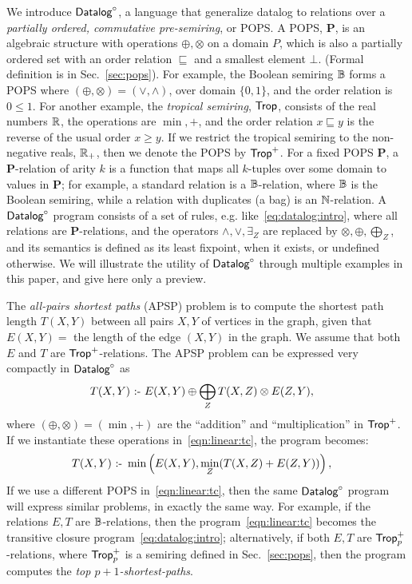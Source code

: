 We introduce $\text{\sf Datalog}^\circ$, a language that generalize datalog to relations
over a {\em partially ordered, commutative pre-semiring}, or POPS.  A
POPS, $\bm P$, is an algebraic structure with operations
$\oplus, \otimes$ on a domain $P$, which is also a partially ordered set with an order
relation $\sqsubseteq$ and a smallest element $\bot$. (Formal
definition is in Sec.~\ref{sec:pops}).  For example, the Boolean
semiring $\mathbb B$ forms a POPS where $(\oplus,\otimes) = (\vee, \wedge)$, over domain
$\{0,1\}$, and the order relation is $0 \leq 1$.  For another example, the {\em
  tropical semiring}, $\text{\sf Trop}$, consists of the real numbers $\mathbb R$, the
operations are $\min, +$, and the order relation $x \sqsubseteq y$ is
the reverse of the usual order $x \geq y$.  If
we restrict the tropical semiring to the non-negative reals, $\mathbb R_+$, then
we denote the POPS by $\text{\sf Trop}^+$.  For a fixed POPS $\bm P$, a
$\bm P$-relation of arity $k$ is a function that maps all $k$-tuples
over some domain to values in $\bm P$; for example, a standard
relation is a $\mathbb B$-relation, where $\mathbb B$ is the Boolean semiring, while
a relation with duplicates (a bag) is an $\mathbb N$-relation.  A $\text{\sf Datalog}^\circ$
program consists of a set of rules, e.g.
like~\eqref{eq:datalog:intro}, where all relations are
$\bm P$-relations, and the operators $\wedge, \vee, \exists_Z$ are
replaced by $\otimes, \oplus, \bigoplus_Z$, and its semantics is
defined as its least fixpoint, when it exists, or undefined otherwise.
We will illustrate the utility of $\text{\sf Datalog}^\circ$ through multiple examples in
this paper, and give here only a preview.

\begin{ex} \label{ex:intro} The {\em all-pairs shortest paths} (APSP) problem is to compute the
  shortest path length $T(X,Y)$ between all pairs $X,Y$ of vertices in
  the graph, given that $E(X,Y)=$ the length of the edge $(X,Y)$ in
  the graph.  We assume that both $E$ and $T$ are $\text{\sf Trop}^+$-relations.
  The APSP problem can be expressed very compactly in $\text{\sf Datalog}^\circ$ as
  \begin{align}
    T(X,Y) &\text{ :- } E(X,Y) \oplus \bigoplus_Z T(X,Z) \otimes E(Z,Y), \label{eqn:linear:tc}
  \end{align}
%
  where $(\oplus,\otimes) = (\min, +)$ are the ``addition'' and
  ``multiplication'' in $\text{\sf Trop}^+$.  If we instantiate these operations
  in~\eqref{eqn:linear:tc}, the program becomes:
  \begin{align}
    T(X,Y) &\text{ :- } \min\left(E(X,Y), \min_Z (T(X,Z) + E(Z,Y))\right), \label{eqn:apsp}
  \end{align}
%
  If we use a different POPS in~\eqref{eqn:linear:tc}, then the same
  $\text{\sf Datalog}^\circ$ program will express similar problems, in exactly the same
  way. For example, if the relations $E, T$ are $\mathbb B$-relations, then
  the program~\eqref{eqn:linear:tc} becomes the {\sf transitive
    closure} program~\eqref{eq:datalog:intro}; alternatively, if both
  $E, T$ are $\text{\sf Trop}^+_p$-relations, where $\text{\sf Trop}^+_p$ is a semiring
  defined in Sec.~\ref{sec:pops}, then the program computes the {\em
    top $p+1$-shortest-paths}.
\end{ex}

